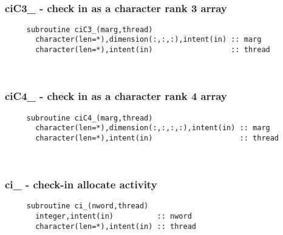  
\mbox{}\hrulefill\ 
 
  \subsubsection{ciC3\_ - check in as a character rank 3 array}

\begin{verbatim} 
     subroutine ciC3_(marg,thread)
       character(len=*),dimension(:,:,:),intent(in) :: marg
       character(len=*),intent(in)                  :: thread
 \end{verbatim}%
 
 
\mbox{}\hrulefill\ 

  \subsubsection{ciC4\_ - check in as a character rank 4 array}

\begin{verbatim} 
     subroutine ciC4_(marg,thread)
       character(len=*),dimension(:,:,:,:),intent(in) :: marg
       character(len=*),intent(in)                    :: thread
 \end{verbatim}%
 
 
\mbox{}\hrulefill\ 
 
  \subsubsection{ci\_ - check-in allocate activity}

\begin{verbatim} 
     subroutine ci_(nword,thread)
       integer,intent(in)          :: nword
       character(len=*),intent(in) :: thread
 \end{verbatim}%
 
